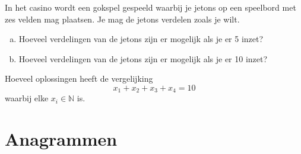\documentclass[12pt,twoside]{article}
\begin{document}
\begin{oefening}
In het casino wordt een gokspel gespeeld waarbij je jetons op een speelbord met zes velden mag plaatsen. Je mag de jetons verdelen zoals je wilt.
\begin{enumerate}[(a)]
  \item Hoeveel verdelingen van de jetons zijn er mogelijk als je er 5 inzet?
  \item Hoeveel verdelingen van de jetons zijn er mogelijk als je er 10 inzet?
\end{enumerate}
\end{oefening}

\begin{oefening} %
Hoeveel oplossingen heeft de vergelijking
$$x_1 + x_2 + x_3 + x_4 = 10$$
waarbij elke $x_i\in\mathbb{N}$ is.
\end{oefening}

\pagebreak
\section{Anagrammen}
\end{document}
